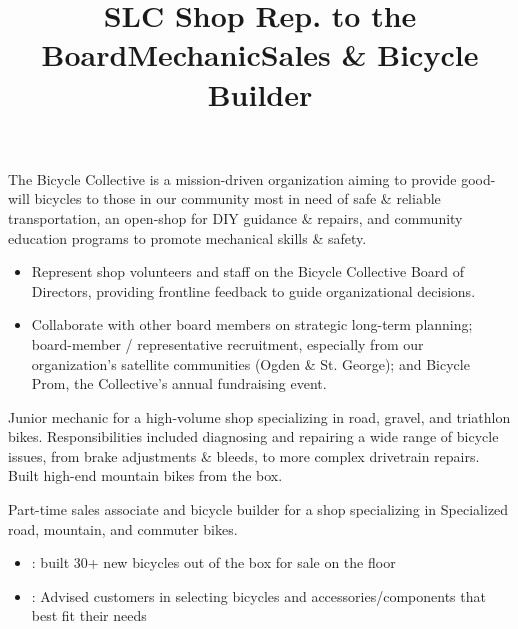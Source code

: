 \documentclass[resmargin, centered, 10pt]{../res}
\begin{document}
\begin{resume}
\title{SLC Shop Rep. to the Board}
\begin{position}
	The Bicycle Collective is a mission-driven organization aiming to provide good-will bicycles to those in our community most in need of safe \& reliable transportation, an open-shop for DIY guidance \& repairs, and community education programs to promote mechanical skills \& safety.
	\begin{itemize}
		\item {} Represent shop volunteers and staff on the Bicycle Collective Board of Directors, providing frontline feedback to guide organizational decisions.
		\item {} Collaborate with other board members on strategic long-term planning; board-member / representative recruitment, especially from our organization's satellite communities (Ogden \& St. George); and Bicycle Prom, the Collective's annual fundraising event.
	\end{itemize}
\end{position}

\title{Mechanic}
\begin{position}
	Junior mechanic for a high-volume shop specializing in road, gravel, and triathlon bikes. Responsibilities included diagnosing and repairing a wide range of bicycle issues, from brake adjustments \& bleeds, to more complex drivetrain repairs. Built high-end mountain bikes from the box.
\end{position}

\title{Sales \& Bicycle Builder}
\begin{position}
	Part-time sales associate and bicycle builder for a shop specializing in Specialized road, mountain, and commuter bikes. 
	\begin{itemize}
		\item {}: built 30+ new bicycles out of the box for sale on the floor
		\item {}: Advised customers in selecting bicycles and accessories/components that best fit their needs
	\end{itemize}
\end{position}

\fullline


\end{resume}
\end{document}
